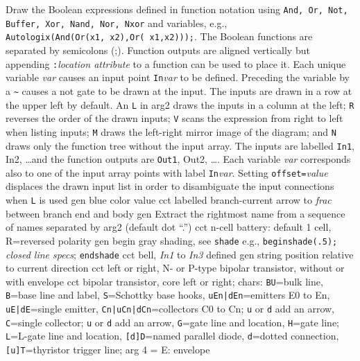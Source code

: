   {Draw the Boolean expressions defined in function notation
   using {\tt And, Or, Not, Buffer, Xor, Nand, Nor, Nxor}
   and variables, e.g.,
   {\tt Autologix(And(Or(x1,~x2),Or(~x1,x2)));}.
   The Boolean functions are separated by semicolons (;). Function
   outputs are aligned vertically but appending
   {\tt:}{\sl location attribute} to a function can be used to place it.
   Each unique variable {\sl var} causes an input point {\tt In}{\sl var} 
   to be defined.  Preceding the variable by a {\tt \~{}} causes a not gate
   to be drawn at the input.
   The inputs are drawn in a row at the upper left by default.
   An {\tt L} in arg2 draws the inputs in a column at the left;
   {\tt R} reverses the order of the drawn inputs;
   {\tt V} scans the expression from right to left
   when listing inputs;
   {\tt M} draws the left-right mirror image of the diagram;
   and {\tt N} draws only the function tree without the input array.
   The inputs are labelled {\tt In1}, {In2}, \ldots and the function
   outputs are {\tt Out1}, {Out2}, \dots.
   Each variable {\sl var} corresponds also to one of the input array
   points with label {\tt In}{\sl var}.
   Setting {\tt offset=}{\sl value} displaces the
   drawn input list in order to disambiguate the input connections when {\tt L}
   is used}
  {gen}
  {blue color value}
  {cct}
  {labelled branch-current arrow to {\sl frac} between branch end and body
    }
  {gen}
  {Extract the rightmost name from a sequence of names separated by arg2
   (default dot ``.'')}
  {cct}
  {n-cell battery: default 1 cell,
  R=reversed polarity}
  {gen}
  {begin gray shading, see {\tt shade}
   e.g., {\tt beginshade(.5);} {\sl closed line specs}; {\tt endshade}}
  {cct}
  {bell, {\sl In1} to {\sl In3} defined
   }
  {gen}
  {string position relative to current direction}
  {cct}
  {left or right, N- or P-type bipolar transistor, without or with envelope 
    }
  {cct}
  { bipolar transistor, core left or right; chars:
   {\tt BU}=bulk line,
   {\tt B}=base line and label,
   {\tt S}=Schottky base hooks,
   {\tt uEn|dEn}=emitters E0 to En,
   {\tt uE|dE}=single emitter,
   {\tt Cn|uCn|dCn}=collectors C0 to Cn; {\tt u} or {\tt d} add an arrow,
   {\tt C}=single collector; {\tt u} or {\tt d} add an arrow,
   {\tt G}=gate line and location,
   {\tt H}=gate line; {\tt L}=L-gate line and location,
   {\tt [d]D}=named parallel diode,
   {\tt d}=dotted connection,
   {\tt [u]T}=thyristor trigger line;
   arg 4 = E: envelope
    }

